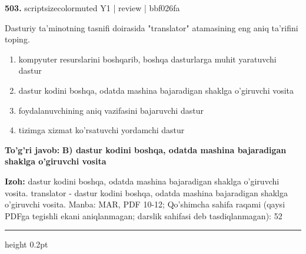 \documentclass[10pt,a4paper]{article}
\begin{document}
{\bfseries\sffamily\color{ink} 503.} {scriptsizecolor{muted} Y1 | review | bbf026fa}
\par
Dasturiy ta'minotning tasnifi doirasida "translator" atamasining eng aniq ta'rifini toping.
\begin{enumerate}[label=\Alph*),leftmargin=9mm]
\item kompyuter resurslarini boshqarib, boshqa dasturlarga muhit yaratuvchi dastur
\item dastur kodini boshqa, odatda mashina bajaradigan shaklga o'giruvchi vosita
\item foydalanuvchining aniq vazifasini bajaruvchi dastur
\item tizimga xizmat ko'rsatuvchi yordamchi dastur
\end{enumerate}
\begin{tcolorbox}[enhanced,breakable,colback=teal!4,colframe=teal!60!black,boxrule=0.45pt,arc=1.2mm,left=2.7mm,right=2.7mm,top=1.8mm,bottom=1.8mm,before skip=2mm,after skip=2mm]
{\bfseries\sffamily\color{teal}To'g'ri javob:} \textbf{B) dastur kodini boshqa, odatda mashina bajaradigan shaklga o'giruvchi vosita}
\par\smallskip
{\bfseries Izoh:} dastur kodini boshqa, odatda mashina bajaradigan shaklga o'giruvchi vosita. translator - dastur kodini boshqa, odatda mashina bajaradigan shaklga o'giruvchi vosita. Manba: MAR, PDF 10-12; Qo'shimcha sahifa raqami (qaysi PDFga tegishli ekani aniqlanmagan; darslik sahifasi deb tasdiqlanmagan): 52
\end{tcolorbox}
\vspace{2mm}\hrule height 0.2pt\vspace{3mm}
\end{document}
